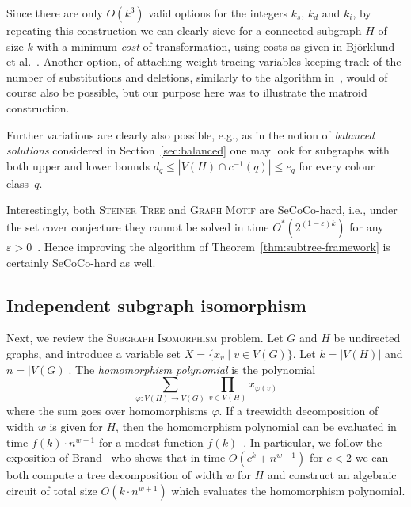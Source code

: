 \documentclass[10pt,a4paper]{article}
\begin{document}
Since there are only $O(k^3)$ valid options for the integers $k_s$,
$k_d$ and $k_i$, by repeating this construction we can clearly sieve
for a connected subgraph $H$ of size $k$ with a minimum \emph{cost}
of transformation, using costs as given in Björklund et al.~\cite{BjorklundKK16}.
Another option, of attaching weight-tracing variables keeping track of the
number of substitutions and deletions, similarly to the algorithm in~\cite{BjorklundKK16},
would of course also be possible, but our purpose here was to
illustrate the matroid construction.

Further variations are clearly also possible, e.g., as in the notion
of \emph{balanced solutions} considered in Section~\ref{sec:balanced}
one may look for subgraphs with both upper and lower bounds 
$d_q \leq |V(H) \cap c^{-1}(q)| \leq e_q$ for every colour class~$q$. 

Interestingly, both \textsc{Steiner Tree} and \textsc{Graph Motif}
are SeCoCo-hard, i.e., under the set cover conjecture they cannot be
solved in time $O^*(2^{(1-\varepsilon)k})$ for any $\varepsilon > 0$~\cite{CyganDLMNOPSW16seth}.
Hence improving the algorithm of Theorem~\ref{thm:subtree-framework} is certainly SeCoCo-hard as well. 

\subsection{Independent subgraph isomorphism}
\label{subsec:subgraphiso}
Next, we review the \textsc{Subgraph Isomorphism} problem.
Let $G$ and $H$ be undirected graphs, and introduce a variable set $X=\{x_v \mid v \in V(G)\}$. 
Let $k=|V(H)|$ and $n=|V(G)|$. The \emph{homomorphism polynomial}
is the polynomial
\[
  \sum_{\varphi \colon V(H) \to V(G)}  \prod_{v \in V(H)} x_{\varphi(v)}
\]
where the sum goes over homomorphisms $\varphi$.
If a treewidth decomposition of width $w$ is given for $H$,
then the homomorphism polynomial can be evaluated
in time $f(k) \cdot n^{w+1}$ for a modest function $f(k)$~\cite{FominLRSR12}.
In particular, we follow the exposition of Brand~\cite{Brand19thesis}
who shows that in time $O(c^k+n^{w+1})$ for $c<2$ we can both compute a tree
decomposition of width $w$ for $H$ and construct an algebraic circuit
of total size $O(k \cdot n^{w+1})$ which evaluates the homomorphism
polynomial.
\end{document}
